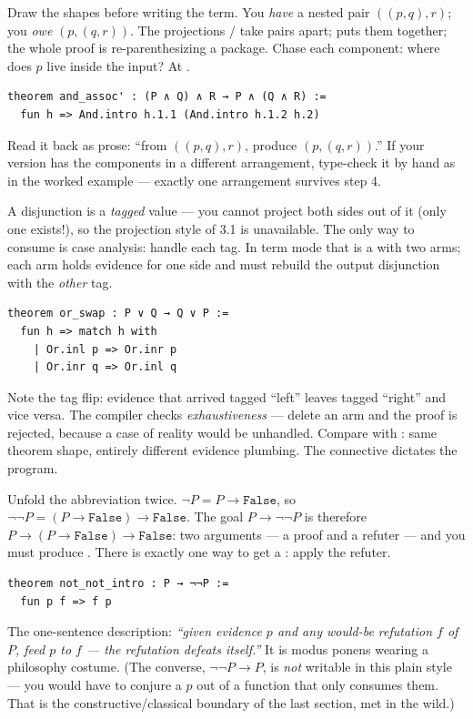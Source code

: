\pathway Draw the shapes before writing the term. You \emph{have} a
nested pair $((p,q),r)$; you \emph{owe} $(p,(q,r))$. The projections
/ take pairs apart;  puts them together;
the whole proof is re-parenthesizing a package. Chase each component: where
does $p$ live inside the input? At .
\answer
\begin{lstlisting}[language=Lean]
theorem and_assoc' : (P ∧ Q) ∧ R → P ∧ (Q ∧ R) :=
  fun h => And.intro h.1.1 (And.intro h.1.2 h.2)
\end{lstlisting}
Read it back as prose: ``from $((p,q),r)$, produce $(p,(q,r))$.'' If your
version has the components in a different arrangement, type-check it by
hand as in the worked example --- exactly one arrangement survives step 4.

\pathway A disjunction is a \emph{tagged} value --- you cannot project both
sides out of it (only one exists!), so the projection style of 3.1 is
unavailable. The only way to consume  is case analysis: handle
each tag. In term mode that is a  with two arms; each arm
holds evidence for one side and must rebuild the output disjunction with
the \emph{other} tag.
\answer
\begin{lstlisting}[language=Lean]
theorem or_swap : P ∨ Q → Q ∨ P :=
  fun h => match h with
    | Or.inl p => Or.inr p
    | Or.inr q => Or.inl q
\end{lstlisting}
Note the tag flip: evidence that arrived tagged ``left'' leaves tagged
``right'' and vice versa. The compiler checks \emph{exhaustiveness} ---
delete an arm and the proof is rejected, because a case of reality would
be unhandled. Compare with : same theorem shape, entirely
different evidence plumbing. The connective dictates the program.

\pathway Unfold the abbreviation twice.
$\lnot P = P \to \mathtt{False}$, so
$\lnot\lnot P = (P \to \mathtt{False}) \to \mathtt{False}$. The goal
$P \to \lnot\lnot P$ is therefore
$P \to (P \to \mathtt{False}) \to \mathtt{False}$: two arguments --- a
proof and a refuter --- and you must produce . There is exactly
one way to get a : apply the refuter.
\answer
\begin{lstlisting}[language=Lean]
theorem not_not_intro : P → ¬¬P :=
  fun p f => f p
\end{lstlisting}
The one-sentence description: \emph{``given evidence $p$ and any would-be
refutation $f$ of $P$, feed $p$ to $f$ --- the refutation defeats
itself.''} It is modus ponens wearing a philosophy costume. (The converse,
$\lnot\lnot P \to P$, is \emph{not} writable in this plain style --- you
would have to conjure a $p$ out of a function that only consumes them.
That is the constructive/classical boundary of the last section, met in
the wild.)

